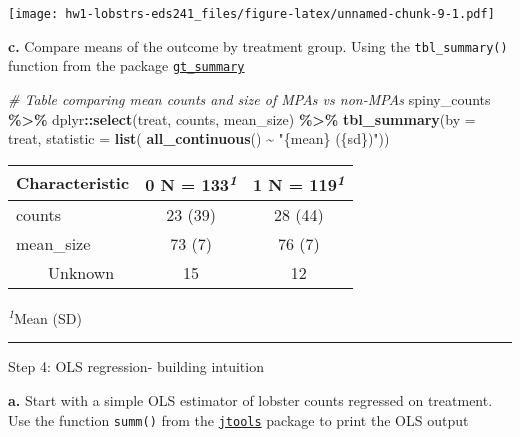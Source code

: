\documentclass[
]{article}
\newenvironment{Shaded}{\begin{snugshade}}{\end{snugshade}}
\newcommand{\AttributeTok}[1]{\textcolor[rgb]{0.13,0.29,0.53}{#1}}
\newcommand{\CommentTok}[1]{\textcolor[rgb]{0.56,0.35,0.01}{\textit{#1}}}
\newcommand{\FunctionTok}[1]{\textcolor[rgb]{0.13,0.29,0.53}{\textbf{#1}}}
\newcommand{\NormalTok}[1]{#1}
\newcommand{\SpecialCharTok}[1]{\textcolor[rgb]{0.81,0.36,0.00}{\textbf{#1}}}
\newcommand{\StringTok}[1]{\textcolor[rgb]{0.31,0.60,0.02}{#1}}
\begin{document}
\texttt{[image: hw1-lobstrs-eds241\_files/figure-latex/unnamed-chunk-9-1.pdf]}

\textbf{c.} Compare means of the outcome by treatment group. Using the
\texttt{tbl\_summary()} function from the package
\href{https://www.danieldsjoberg.com/gtsummary/articles/tbl_summary.html}{\texttt{gt\_summary}}

\begin{Shaded}
\begin{Highlighting}[]
\CommentTok{\# Table comparing mean counts and size of MPAs vs non{-}MPAs}
\NormalTok{spiny\_counts }\SpecialCharTok{\%\textgreater{}\%} 
\NormalTok{    dplyr}\SpecialCharTok{::}\FunctionTok{select}\NormalTok{(treat, counts, mean\_size) }\SpecialCharTok{\%\textgreater{}\%} 
    \FunctionTok{tbl\_summary}\NormalTok{(}\AttributeTok{by =}\NormalTok{ treat,}
                \AttributeTok{statistic =} \FunctionTok{list}\NormalTok{(}
      \FunctionTok{all\_continuous}\NormalTok{() }\SpecialCharTok{\textasciitilde{}} \StringTok{"\{mean\} (\{sd\})"}\NormalTok{))}
\end{Highlighting}
\end{Shaded}

\begin{table}[!t]
\fontsize{12.0pt}{14.4pt}\selectfont
\begin{tabular*}{\linewidth}{@{\extracolsep{\fill}}lcc}
\toprule
\textbf{Characteristic} & \textbf{0}  N = 133\textsuperscript{\textit{1}} & \textbf{1}  N = 119\textsuperscript{\textit{1}} \\ 
\midrule\addlinespace[2.5pt]
counts & 23 (39) & 28 (44) \\ 
mean\_size & 73 (7) & 76 (7) \\ 
    Unknown & 15 & 12 \\ 
\bottomrule
\end{tabular*}
\begin{minipage}{\linewidth}
\textsuperscript{\textit{1}}Mean (SD)\\
\end{minipage}
\end{table}

\begin{center}\rule{0.5\linewidth}{0.5pt}\end{center}

Step 4: OLS regression- building intuition

\textbf{a.} Start with a simple OLS estimator of lobster counts
regressed on treatment. Use the function \texttt{summ()} from the
\href{https://jtools.jacob-long.com/}{\texttt{jtools}} package to print
the OLS output
\end{document}
